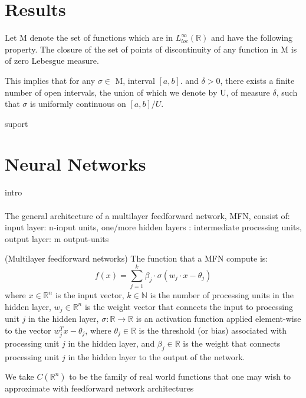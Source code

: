 \documentclass[../main.tex]{subfiles}
\begin{document}
\section{Results}
\begin{definition} Let M denote the set of functions which are in $L_{loc}^{\infty}(\mathbb{R})$ and have the following property. The closure of the set of points of discontinuity of any function in M is of zero Lebesgue measure. 
\begin{proposition}
This implies that for any $\sigma \in$ M, interval $[a,b] .$ and $\delta >0$, there exists a finite number of open intervals, the union of which we denote by U, of measure $\delta$, such that $\sigma$ is uniformly continuous on $[a,b]/U$. 
\end{proposition}
\end{definition}

\begin{definition} suport
	
\end{definition}
\section{Neural Networks}
intro \\ \\ 
The general architecture of a multilayer feedforward network, MFN, consist of: input layer: n-input units,  one/more hidden layers : intermediate processing units, output layer: m output-units
\begin{definition} (Multilayer feedforward networks) The function that a MFN compute is: 
	$$f(x)=\sum_{j=1}^k \beta_j \cdot \sigma(w_j \cdot x - \theta_j)$$
	where $x \in \mathbb{R}^n$ is the input vector, $k \in \mathbb{N}$ is the number of processing units in the hidden layer, $w_j \in \mathbb{R}^n$ is the weight vector that connects the input to processing unit $j$ in the hidden layer, $\sigma : \mathbb{R} \rightarrow \mathbb{R}$ is an activation function applied element-wise to the vector $w_j^T x - \theta_j$, where $\theta_j \in \mathbb{R}$ is the threshold (or bias) associated with processing unit $j$ in the hidden layer, and $\beta_j \in \mathbb{R}$ is the weight that connects processing unit $j$ in the hidden layer to the output of the network.

\end{definition}

\noindent We take $C(\mathbb{R}^n)$ to be the family of real world functions that one may wish to approximate with feedforward network architectures \\ 
\end{document}
